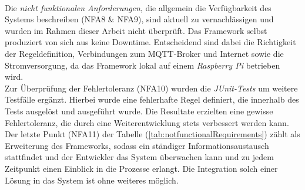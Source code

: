         \\
        \linebreak
        Die \textit{nicht funktionalen Anforderungen}, die allgemein die Verfügbarkeit des Systems beschreiben (NFA8 \& NFA9), sind aktuell zu vernachlässigen und wurden im Rahmen dieser 
        Arbeit nicht überprüft. Das Framework selbst produziert von sich aus keine Downtime. Entscheidend sind dabei die Richtigkeit der Regeldefinition, 
        Verbindungen zum \acs{MQTT}-Broker und Internet sowie die Stromversorgung, da das Framework lokal auf einem \textit{Raspberry Pi} betrieben wird. 
        \\
        \linebreak
        Zur Überprüfung der Fehlertoleranz (NFA10) wurden die \textit{JUnit-Tests} um weitere Testfälle ergänzt. Hierbei wurde eine fehlerhafte Regel definiert, die innerhalb des 
        Tests ausgelöst und ausgeführt wurde. Die Resultate erzielten eine gewisse Fehlertoleranz, die durch eine Weiterentwicklung stets verbessert werden kann.
        \\
        \linebreak
        Der letzte Punkt (NFA11) der Tabelle (\ref{tab:notfunctionalRequirements}) zählt als Erweiterung des Frameworks, sodass ein ständiger Informationsaustausch stattfindet und der 
        Entwickler das System überwachen kann und zu jedem Zeitpunkt einen Einblick in die Prozesse erlangt. Die Integration solch einer Lösung in das System ist ohne weiteres möglich.
    
